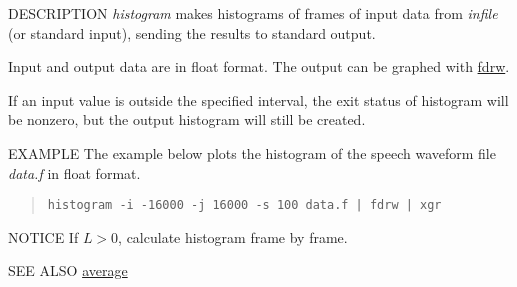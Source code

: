 \begin{synopsis}
\item [histogram] [ --l $L$ ] [ --i $I$ ] [ --j $J$ ] [ --s $S$ ] [ --n ] 
                  [ {\em infile} ] 
\end{synopsis}

\begin{qsection}{DESCRIPTION}
{\em histogram} makes histograms of frames of input data 
from {\em infile} (or standard input), 
sending the results to standard output.

Input and output data are in float format.
The output can be graphed with \hyperlink{fdrw}{fdrw}.

If an input value is outside the specified interval, 
the exit status of histogram will be nonzero, 
but the output histogram will still be created.
\end{qsection}

\begin{options}
\end{options}

\begin{qsection}{EXAMPLE}
The example below plots the histogram of the speech waveform file
{\em data.f} in float format.
\begin{quote}
 \verb!histogram -i -16000 -j 16000 -s 100 data.f | fdrw | xgr!
\end{quote} 
\end{qsection}

\begin{qsection}{NOTICE}
If $L > 0$, calculate histogram frame by frame.
\end{qsection}

\begin{qsection}{SEE ALSO}
\hyperlink{average}{average}
\end{qsection}
